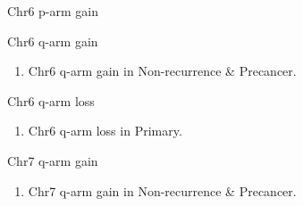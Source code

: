 \documentclass{beamer}
\begin{document}
\begin{frame}[allowframebreaks]
\begin{block}{Chr6 p-arm gain}
            \begin{table}
                \caption{CGC Tier1 genes in Chr6 p-arm}
                \resizebox{\linewidth}{!}
                {}
            \end{table}
        \end{block}

        \begin{block}{Chr6 q-arm gain}
            \begin{enumerate}
                \item Chr6 q-arm gain in Non-recurrence \& Precancer.
            \end{enumerate}

            \begin{table}
                \caption{CGC Tier1 genes in Chr6 q-arm}
                \resizebox{\linewidth}{!}
                {}
            \end{table}
        \end{block}

        \begin{block}{Chr6 q-arm loss}
            \begin{enumerate}
                \item Chr6 q-arm loss in Primary.
            \end{enumerate}

            \begin{table}
                \caption{CGC Tier1 genes in Chr6 q-arm}
                \resizebox{\linewidth}{!}
                {}
            \end{table}
        \end{block}

        \begin{block}{Chr7 q-arm gain}
            \begin{enumerate}
                \item Chr7 q-arm gain in Non-recurrence \& Precancer.
            \end{enumerate}

            \begin{table}
                \caption{CGC Tier1 genes in Chr7 q-arm}
                \resizebox{\linewidth}{!}
                {}
            \end{table}
        \end{block}


\end{frame}
\end{document}
